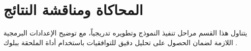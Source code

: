 
\section{المحاكاة ومناقشة النتائج} \label{part1:sec3}
  
  {\fontsize{16}{28}\selectfont
  يتناول هذا القسم مراحل تنفيذ النموذج وتطويره تدريجياً، مع توضيح الإعدادات البرمجية اللازمة لضمان الحصول على تحليل دقيق للتوافقيات باستخدام أداة  الملحقة ببلوك .
  \par}

  




